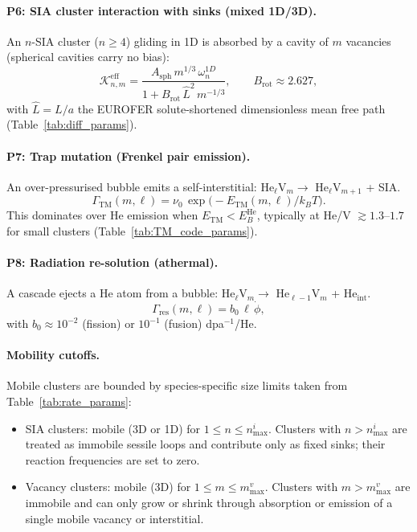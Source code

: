 \paragraph{P6: SIA cluster interaction with sinks (mixed 1D/3D).}
An $n$-SIA cluster ($n \geq 4$) gliding in 1D is absorbed by a cavity of
$m$ vacancies (spherical cavities carry no bias):
\begin{equation}\label{eq:P6}
    \mathcal{K}_{n,m}^{\mathrm{eff}}
    = \frac{A_{\mathrm{sph}}\,m^{1/3}\,\omega_n^{1D}}
           {1 + B_{\mathrm{rot}}\,\hat{L}^2\,m^{-1/3}},
    \qquad B_{\mathrm{rot}} \approx 2.627,
\end{equation}
with $\hat{L} = L/a$ the EUROFER solute-shortened dimensionless mean free
path (Table~\ref{tab:diff_params}).

\paragraph{P7: Trap mutation (Frenkel pair emission).}
An over-pressurised bubble emits a self-interstitial:
He$_\ell$V$_m \to$ He$_\ell$V$_{m+1}$ + SIA.
\begin{equation}\label{eq:P7}
    \Gamma_{\mathrm{TM}}(m,\ell)
    = \nu_0\,\exp\!\bigl(-E_{\mathrm{TM}}(m,\ell)/k_BT\bigr).
\end{equation}
This dominates over He emission when $E_{\mathrm{TM}} < E_B^{\mathrm{He}}$,
typically at He/V $\gtrsim 1.3$--$1.7$ for small clusters
(Table~\ref{tab:TM_code_params}).

\paragraph{P8: Radiation re-solution (athermal).}
A cascade ejects a He atom from a bubble:
He$_\ell$V$_m \to$ He$_{\ell-1}$V$_m$ + He$_{\mathrm{int}}$.
\begin{equation}\label{eq:P8}
    \Gamma_{\mathrm{res}}(m,\ell)
    = b_0\,\ell\,\dot{\phi},
\end{equation}
with $b_0 \approx 10^{-2}$ (fission) or $10^{-1}$ (fusion) dpa$^{-1}$/He.

\paragraph{Mobility cutoffs.}
Mobile clusters are bounded by species-specific size limits taken from
Table~\ref{tab:rate_params}:
\begin{itemize}
    \item SIA clusters: mobile (3D or 1D) for $1 \leq n \leq n_{\max}^i$.
    Clusters with $n > n_{\max}^i$ are treated as immobile sessile loops and
    contribute only as fixed sinks; their reaction frequencies are set to zero.
    \item Vacancy clusters: mobile (3D) for $1 \leq m \leq m_{\max}^v$.
    Clusters with $m > m_{\max}^v$ are immobile and can only grow or shrink
    through absorption or emission of a single mobile vacancy or interstitial.
\end{itemize}

